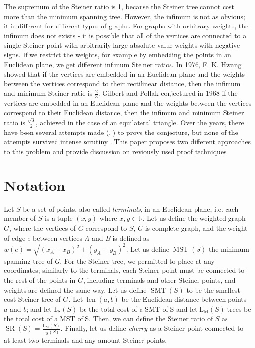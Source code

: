 \documentclass{mpaper}
\begin{document}
The supremum of the Steiner ratio is 1, because the Steiner tree cannot cost more than the minimum spanning tree. However, the infimum is not as obvious; it is different for different types of graphs. For graphs with arbitrary weights, the infimum does not exists - it is possible that all of the vertices are connected to a single Steiner point with arbitrarily large absolute value weights with negative signs. If we restrict the weights, for example by embedding the points in an Euclidean plane, we get different infimum Steiner ratios. In 1976, F. K. Hwang \cite{doi:10.1137/0130013} showed that if the vertices are embedded in an Euclidean plane and the weights between the vertices correspond to their rectilinear distance, then the infimum and minimum Steiner ratio is $\frac{2}{3}$. Gilbert and Pollak conjectured in 1968 \cite{GP1968} if the vertices are embedded in an Euclidean plane and the weights between the vertices correspond to their Euclidean distance, then the infimum and minimum Steiner ratio is $\frac{\sqrt{3}}{2}$, achieved in the case of an equilateral triangle. Over the years, there have been several attempts made (\cite{doi:10.1073/pnas.87.23.9464}, \cite{myue}) to prove the conjecture, but none of the attempts survived intense scrutiny \cite{Ivanov2012}. This paper proposes two different approaches to this problem and provide discussion on reviously used proof techniques.


\section{Notation}

Let $S$ be a set of points, also called \emph{terminals}, in an Euclidean plane, i.e. each member of $S$ is a tuple $(x,y)$ where $x,y\in\mathbb{R}$. Let us define the weighted graph $G$, where the vertices of $G$ correspond to $S$, $G$ is complete graph, and the weight of edge $e$ between vertices $A$ and $B$ is defined as $w(e)=\sqrt{(x_A-x_B)^2+(y_A-y_B)^2}$. Let us define $\operatorname{MST}(S)$ the minimum spanning tree of $G$. For the Steiner tree, we permitted to place at any coordinates; similarly to the terminals, each Steiner point must be connected to the rest of the points in $G$, including terminals and other Steiner points, and weights are defined the same way. Let us define $\operatorname{SMT}(S)$ to be the smallest cost Steiner tree of $G$. Let $\operatorname{len}(a,b)$ be the Euclidean distance between points $a$ and $b$; and let $\operatorname{L_S}(S)$ be the total cost of a SMT of S and let $\operatorname{L_M}(S)$ trees be the total cost of a MST of S.  Then, we can define the Steiner ratio of $S$ as $\operatorname{SR}(S)=\frac{\operatorname{L_M}(S)}{\operatorname{L_S}(S)}$.
Finally, let us define \emph{cherry} as a Steiner point connected to at least two terminals and any amount Steiner points.
\end{document}
